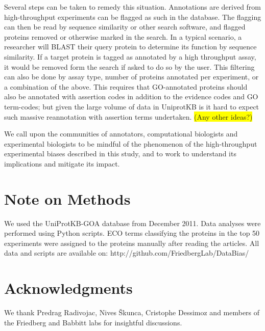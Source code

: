 \documentclass[12pt]{article}
\newcommand{\hilite}[1]{\colorbox{yellow}{#1}}
\begin{document}
Several steps can be taken to remedy this situation. Annotations are derived from
high-throughput experiments can be flagged as such in the database. The flagging can then be
read by sequence similarity or other search software, and flagged proteins removed or
otherwise marked in the search.  In a typical scenario, a researcher will BLAST their query
protein to determine its function by sequence similarity. If a target protein is tagged as
annotated by a high throughput assay, it would be removed form the search if asked to do so
by the user. This filtering can also be done by assay type, number of proteins annotated per
experiment, or a combination of the above. This requires that GO-annotated proteins should
also be annotated with assertion codes in addition to the evidence codes and GO term-codes;
but given the large volume of data in UniprotKB is it hard to expect such massive
reannotation with assertion terms undertaken. \hilite{(Any other ideas?)}

We call upon the communities of annotators, computational biologists and experimental biologists to be
mindful of the phenomenon of the high-throughput experimental biases described in this study, and to
work to understand its implications and mitigate its impact.


\section*{Note on Methods}
We used the UniProtKB-GOA database from December 2011. Data analyses were performed using Python scripts.
ECO terms classifying the proteins in the top 50 experiments were assigned to the proteins
manually after reading the articles. All data and scripts are available on:
http://github.com/FriedbergLab/DataBias/

\section*{Acknowledgments}
We thank Predrag Radivojac, Nives \v{S}kunca, Cristophe Dessimoz and members of the Friedberg and Babbitt labs for
insightful discussions.  
\end{document}
